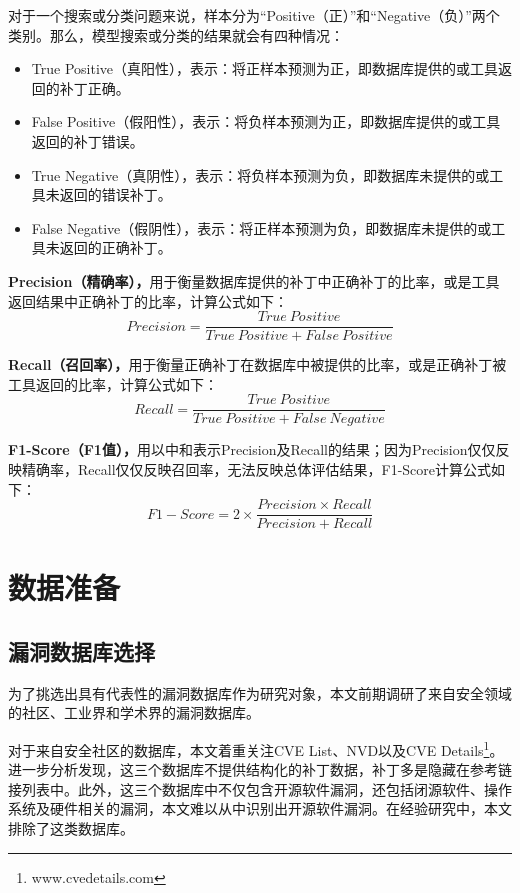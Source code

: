 对于一个搜索或分类问题来说，样本分为“Positive（正）”和“Negative（负）”两个类别。那么，模型搜索或分类的结果就会有四种情况：
\begin{itemize}
    \item True Positive（真阳性），表示：将正样本预测为正，即数据库提供的或工具返回的补丁正确。
    \item False Positive（假阳性），表示：将负样本预测为正，即数据库提供的或工具返回的补丁错误。
    \item True Negative（真阴性），表示：将负样本预测为负，即数据库未提供的或工具未返回的错误补丁。
    \item False Negative（假阴性），表示：将正样本预测为负，即数据库未提供的或工具未返回的正确补丁。
\end{itemize}

\textbf{Precision（精确率），}用于衡量数据库提供的补丁中正确补丁的比率，或是工具返回结果中正确补丁的比率，计算公式如下：
\begin{equation}\label{eq:precision}
    Precision=\frac{True\ Positive}{True\ Positive + False\ Positive} 
\end{equation}

\textbf{Recall（召回率），}用于衡量正确补丁在数据库中被提供的比率，或是正确补丁被工具返回的比率，计算公式如下：
\begin{equation}\label{eq:recall}
    Recall=\frac{True\ Positive}{True\ Positive + False\ Negative} 
\end{equation}

\textbf{F1-Score（F1值），}用以中和表示Precision及Recall的结果；因为Precision仅仅反映精确率，Recall仅仅反映召回率，无法反映总体评估结果，F1-Score计算公式如下：
\begin{equation}\label{eq:f1}
    F1-Score=2 \times \frac{Precision \times Recall}{Precision + Recall} 
\end{equation}

\section{数据准备}\label{sec:preparation}
\subsection{漏洞数据库选择}
为了挑选出具有代表性的漏洞数据库作为研究对象，本文前期调研了来自安全领域的社区、工业界和学术界的漏洞数据库。

对于来自安全社区的数据库，本文着重关注CVE List、NVD以及CVE Details\footnote{www.cvedetails.com}。进一步分析发现，这三个数据库不提供结构化的补丁数据，补丁多是隐藏在参考链接列表中。此外，这三个数据库中不仅包含开源软件漏洞，还包括闭源软件、操作系统及硬件相关的漏洞，本文难以从中识别出开源软件漏洞。在经验研究中，本文排除了这类数据库。


